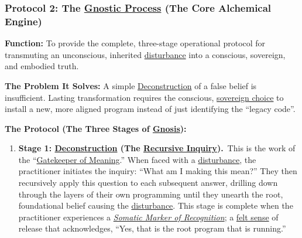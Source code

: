 \documentclass{article}
\begin{document}
\subsubsection*{Protocol 2: The \hyperlink{gloss:gnostic_process}{Gnostic Process} (The Core Alchemical Engine)} \label{protocol_2_the_gnostic_process_the_core_alchemical_engine}
\begin{description}
    \item \textbf{Function:} To provide the complete, three-stage operational protocol for transmuting an unconscious, inherited \hyperlink{gloss:disturbance}{disturbance} into a conscious, sovereign, and embodied truth.
    \item \textbf{The Problem It Solves:} A simple \hyperlink{gloss:deconstruction}{Deconstruction} of a false belief is insufficient. Lasting transformation requires the conscious, \hyperlink{gloss:sovereign_choice}{sovereign choice} to install a new, more aligned program instead of just identifying the ``legacy code''.
    \item \textbf{The Protocol (The Three Stages of \hyperlink{gloss:gnosis}{Gnosis}):}~
    \begin{enumerate}[label={}]
        \item \textbf{Stage 1: \hyperlink{gloss:deconstruction}{Deconstruction} (The \hyperlink{gloss:recursive_inquiry}{Recursive Inquiry}).}~\newline\newline This is the work of the ``\hyperlink{gloss:gatekeeper_of_meaning}{Gatekeeper of Meaning}.'' When faced with a \hyperlink{gloss:disturbance}{disturbance}, the practitioner initiates the inquiry: ``What am I making this mean?'' They then recursively apply this question to each subsequent answer, drilling down through the layers of their own programming until they unearth the root, foundational belief causing the \hyperlink{gloss:disturbance}{disturbance}. This stage is complete when the practitioner experiences a \textit{\hyperlink{gloss:somatic_marker_of_recognition}{Somatic Marker of Recognition}}; a \hyperlink{gloss:felt_sense}{felt sense} of release that acknowledges, ``Yes, that is the root program that is running.''

\end{enumerate}
\end{description}
\end{document}
